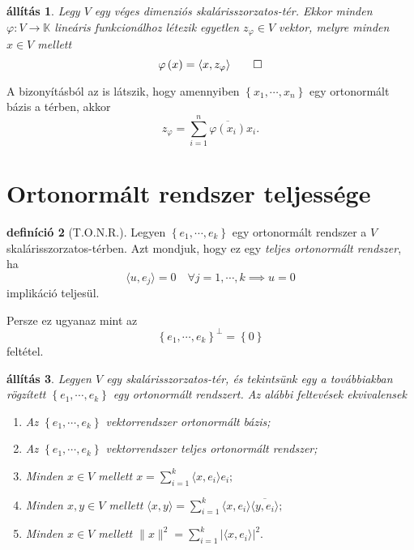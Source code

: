\documentclass[9pt, a4paper, showtrims]{memoir}
\theoremstyle{plain}
\newtheorem{proposition}{állítás}[chapter]
\theoremstyle{remark}
\theoremstyle{definition}
\newtheorem{definition}[proposition]{definíció}
\newcommand{\ip}[2]{\langle#1,#2\rangle}
\begin{document}
\begin{proposition}
    Legy $V$ egy véges dimenziós skalárisszorzatos-tér.
    Ekkor minden $\varphi:V\to\mathbb{K}$ lineáris
    funkcionálhoz létezik egyetlen $z_\varphi\in V$ vektor,
    melyre minden $x\in V$ mellett
    \[
        \varphi\left( x \right)=\ip{x}{z_\varphi}
        \qedhere
    \]
\end{proposition}
A bizonyításból az is látszik, hogy amennyiben 
$\left\{ x_1,\cdots,x_n \right\}$ egy ortonormált bázis a térben, akkor
\[
    z_\varphi=
    \sum_{i=1}^n\overline{\varphi\left( x_i \right)}x_i.
\]


\section{Ortonormált rendszer teljessége}
\begin{definition}[T.O.N.R.]
    Legyen $\left\{ e_1,\cdots,e_k \right\}$ egy ortonormált rendszer a $V$ skalárisszorzatos-térben.
    Azt mondjuk, hogy ez egy \emph{teljes ortonormált rendszer}, ha
    \[
        \ip{u}{e_j}=0\quad\forall j=1,\cdots,k \implies u=0
    \]
    implikáció teljesül.
\end{definition}

Persze ez ugyanaz mint az
$$\left\{ e_1,\cdots,e_k \right\}^\perp =\left\{ 0 \right\}$$
feltétel.

\begin{proposition}
    Legyen $V$ egy skalárisszorzatos-tér, 
    és tekintsünk egy a továbbiakban rögzített 
    $\left\{ e_1,\cdots,e_k \right\}$ egy ortonormált rendszert.
    Az alábbi feltevések ekvivalensek
    \begin{enumerate}
        \item 
            Az $\left\{ e_1,\cdots,e_k \right\}$ vektorrendszer ortonormált bázis;
        \item
            Az $\left\{ e_1,\cdots,e_k \right\}$ vektorrendszer teljes ortonormált rendszer;
        \item
            Minden $x\in V$ mellett 
            \(
                x=
                \sum_{i=1}^k\ip{x}{e_i}e_i;
            \)
        \item
            Minden $x,y\in V$ mellett
            \(
                \ip{x}{y}=
                \sum_{i=1}^k\ip{x}{e_i}\overline{\ip{y}{e_i}};
            \)
        \item
            Minden $x\in V$ mellett
            \(
                \|x\|^2=
                \sum_{i=1}^k|\ip{x}{e_i}|^2.
            \)
                \qedhere
    \end{enumerate}
\end{proposition}
\end{document}
